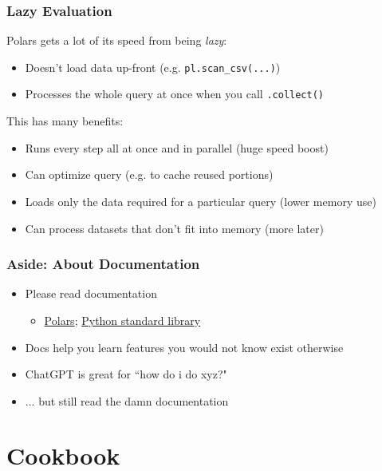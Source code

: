 \documentclass{ali-presentation}
\begin{document}
\begin{frame}
    \frametitle{Lazy Evaluation}

    Polars gets a lot of its speed from being \textit{lazy}:

    \begin{itemize}
        \item Doesn't load data up-front (e.g. \texttt{pl.scan\_csv(...)})
        \item Processes the whole query at once when you call \texttt{.collect()}
    \end{itemize}

    \pause

    This has many benefits:

    \begin{itemize}
        \item Runs every step all at once and in parallel (huge speed boost)
        \item Can optimize query (e.g. to cache reused portions)
        \item Loads only the data required for a particular query (lower memory use)
        \item Can process datasets that don't fit into memory (more later)
    \end{itemize}
\end{frame}

\begin{frame}
    \frametitle{Aside: About Documentation}

    \begin{itemize}
        \item Please read documentation 
            \begin{itemize}
                \item
                    \href{https://docs.pola.rs/api/python/stable/reference/index.html}{Polars};
                    \href{https://docs.python.org/3/library/index.html}{Python standard library}
            \end{itemize}
        \item Docs help you learn features you would not know exist otherwise
        \item ChatGPT is great for ``how do i do xyz?"
        \item ... but still read the damn documentation 
    \end{itemize}
    
\end{frame}

\section{Cookbook}
\end{document}
